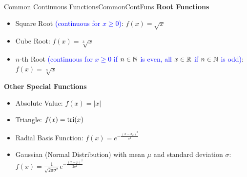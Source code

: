 \begin{propColor}{Common Continuous Functions}{CommonContFuns}
\textbf{Root Functions}
\begin{itemize}
  \item Square Root \textcolor{blue}{(continuous for $ x \geq 0 $)}: $ f(x) = \sqrt{x} $
  \item Cube Root: $ f(x) = \sqrt[3]{x} $
  \item $ n $-th Root \textcolor{blue}{(continuous for $ x \geq 0 $ if $ n \in \mathbb N$ is even, all $ x \in \mathbb R$ if $ n \in \mathbb N$ is odd)}: $ f(x) = \sqrt[n]{x} $
\end{itemize}


\textbf{Other Special Functions}
\begin{itemize}
  \item Absolute Value: $ f(x) = |x| $
  \item Triangle: $f(x) = \mathrm{tri}(x)$
  \item Radial Basis Function: $ f(x) = e^{-\frac{(x-x_c)^2}{s^2}} $
  \item Gaussian (Normal Distribution) with mean $\mu$ and standard deviation $\sigma$:
$f(x) = \frac{1}{\sqrt{2 \pi \sigma^2}} e^{-\frac{(x-\mu)^2}{2 \sigma^2}} $

\end{itemize}

\end{propColor}

\bigskip

